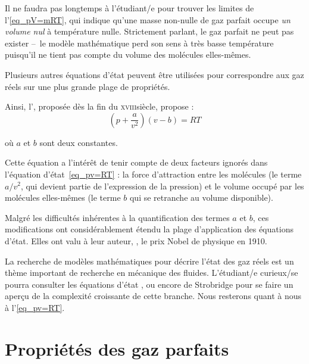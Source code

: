 		Il ne faudra pas longtemps à l’étudiant/e pour trouver les limites de l’\cref{eq_pV=mRT}, qui indique qu’une masse non-nulle de gaz parfait occupe \textit{un volume nul} à température nulle. Strictement parlant, le gaz parfait ne peut pas exister --\ le modèle mathématique perd son sens à très basse température puisqu’il ne tient pas compte du volume des molécules elles-mêmes.

		Plusieurs autres équations d’état peuvent être utilisées pour correspondre aux gaz réels sur une plus grande plage de propriétés.

		Ainsi, l’, proposée dès la fin du \textsc{xviii}\ieme siècle, propose :
		\begin{equation}
			\left(p + \frac{a}{v ^2}\right) (v - b) = R T
		\end{equation}
		\begin{equationterms}
			\item où $a$ et $b$ sont deux constantes.
		\end{equationterms}

		Cette équation a l’intérêt de tenir compte de deux facteurs ignorés dans l’équation d’état~\ref{eq_pv=RT} : la force d’attraction entre les molécules (le terme $a/v^2$, qui devient partie de l’expression de la pression) et le volume occupé par les molécules elles-mêmes (le terme $b$ qui se retranche au volume disponible).

		Malgré les difficultés inhérentes à la quantification des termes $a$ et $b$, ces modifications ont considérablement étendu la plage d’application des équations d’état. Elles ont valu à leur auteur, , le prix Nobel de physique en 1910.

		La recherche de modèles mathématiques pour décrire l’état des gaz réels est un thème important de recherche en mécanique des fluides. L’étudiant/e curieux/se pourra consulter les équations d’état ,  ou encore de Strobridge pour se faire un aperçu de la complexité croissante de cette branche. Nous resterons quant à nous à l’\cref{eq_pv=RT}.



\section{Propriétés des gaz parfaits}


